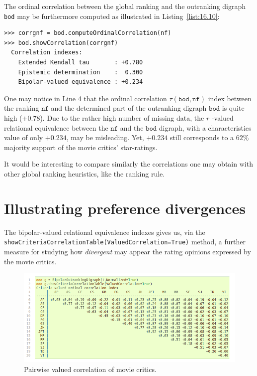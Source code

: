 The ordinal correlation between the global \NetFlows ranking and the outranking digraph \texttt{bod} may be furthermore computed as illustrated in Listing~\vref{list:16.10}: 
\begin{lstlisting}[caption={Computing the ordinal correlation between \NetFlows and global outranking digraph},label=list:16.10]
>>> corrgnf = bod.computeOrdinalCorrelation(nf)
>>> bod.showCorrelation(corrgnf)
  Correlation indexes:
    Extended Kendall tau       : +0.780
    Epistemic determination    :  0.300
    Bipolar-valued equivalence : +0.234
\end{lstlisting}
One may notice in Line 4 that the ordinal correlation $\tau(\mathtt{bod},\mathtt{nf})$ index between the \NetFlows ranking $\mathtt{nf}$ and the determined part of the outranking digraph $\mathtt{bod}$ is quite high ($+0.78$). Due to the rather high number of missing data, the $r$ -valued relational equivalence between the $\mathtt{nf}$ and the $\mathtt{bod}$ digraph, with a characteristics value of only $+0.234$, may be misleading. Yet, $+0.234$ still corresponds to a $62\%$ majority support of the movie critics' star-ratings.

It would be interesting to compare similarly the correlations one may obtain with other global ranking heuristics, like the \Copeland ranking rule.

\section{Illustrating preference divergences}
\label{sec:16.4}

The bipolar-valued relational equivalence indexes gives us, via the \texttt{showCrite\-riaCorrelationTable(ValuedCorrelation=True)} method, a further measure for studying how \emph{divergent} may appear the rating opinions expressed by the movie critics. 
\begin{figure}[ht]
\includegraphics[width=\hsize]{Figures/16-3-correlationTable.png}
\caption{Pairwise valued correlation of movie critics.} 
\label{fig:16.3}       %
\end{figure}

